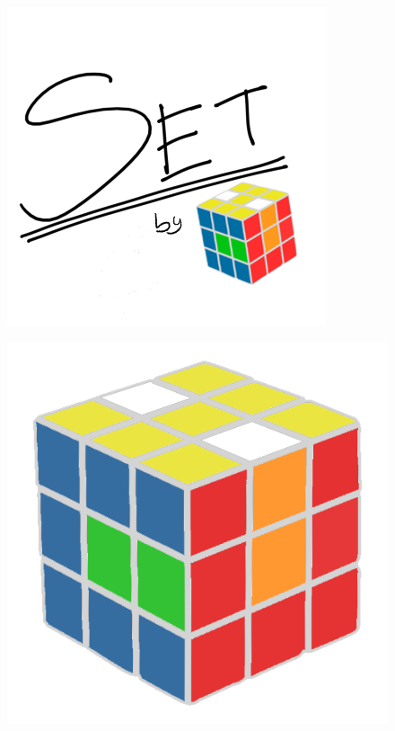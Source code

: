 \documentclass{article}
\begin{document}


\newpage

\begin{figure}[H]
    \centering
    \includegraphics[scale=1.5]{SetLogo.png}
\end{figure}

\newpage

\begin{figure}[H]
    \centering
    \includegraphics[scale=0.2]{logo2.png}
\end{figure}
\end{document}
